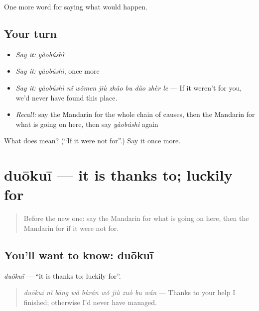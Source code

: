 \begin{grammarlens}[title={What you've built}]
One more word for saying what would happen.
\end{grammarlens}

\subsection*{Your turn}
\begin{itemize}
\raggedright
  \item \emph{Say it:} \emph{yàobúshì}
  \item \emph{Say it:} \emph{yàobúshì}, once more
  \item \emph{Say it:} \emph{yàobúshì nǐ wǒmen jiù zhǎo bu dào zhèr le} — If it weren't for you, we'd never have found this place.
  \item \emph{Recall:} say the Mandarin for the whole chain of causes, then the Mandarin for what is going on here, then say \emph{yàobúshì} again
\end{itemize}

\begin{tcolorbox}[breakable,colback=teal!4,colframe=teal!35!black,title={Before you move on}]
What does  mean? (\textquotedblleft{}If it were not for\textquotedblright{}.) Say it once more.
\end{tcolorbox}
\section[duōkuī]{duōkuī — it is thanks to; luckily for}

\label{lesson:ZH-C541-duokui}



\begin{quote}
Before the new one: say the Mandarin for what is going on here, then the Mandarin for if it were not for.
\end{quote}

\subsection*{You'll want to know: duōkuī}
\emph{duōkuī} — \textquotedblleft{}it is thanks to; luckily for\textquotedblright{}.

\begin{quote}
\emph{duōkuī nǐ bāng wǒ bùrán wǒ jiù zuò bu wán} — Thanks to your help I finished; otherwise I'd never have managed.
\end{quote}


